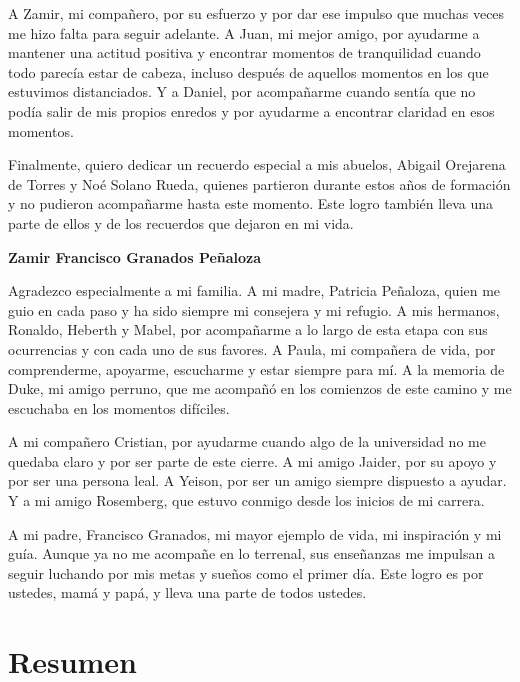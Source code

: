 \documentclass[12pt,oneside,spanish]{book}
\begin{document}
    A Zamir, mi compañero, por su esfuerzo y por dar ese impulso que muchas veces me hizo falta para seguir adelante. A Juan, mi mejor amigo, por ayudarme a mantener una actitud positiva y encontrar momentos de tranquilidad cuando todo parecía estar de cabeza, incluso después de aquellos momentos en los que estuvimos distanciados. Y a Daniel, por acompañarme cuando sentía que no podía salir de mis propios enredos y por ayudarme a encontrar claridad en esos momentos.
    
    Finalmente, quiero dedicar un recuerdo especial a mis abuelos, Abigail Orejarena de Torres y Noé Solano Rueda, quienes partieron durante estos años de formación y no pudieron acompañarme hasta este momento. Este logro también lleva una parte de ellos y de los recuerdos que dejaron en mi vida.
    
    \vspace{0.5cm}
    
    \noindent\textbf{Zamir Francisco Granados Peñaloza}
    
    Agradezco especialmente a mi familia. A mi madre, Patricia Peñaloza, quien me guio en cada paso y ha sido siempre mi consejera y mi refugio. A mis hermanos, Ronaldo, Heberth y Mabel, por acompañarme a lo largo de esta etapa con sus ocurrencias y con cada uno de sus favores. A Paula, mi compañera de vida, por comprenderme, apoyarme, escucharme y estar siempre para mí. A la memoria de Duke, mi amigo perruno, que me acompañó en los comienzos de este camino y me escuchaba en los momentos difíciles.
    
    A mi compañero Cristian, por ayudarme cuando algo de la universidad no me quedaba claro y por ser parte de este cierre. A mi amigo Jaider, por su apoyo y por ser una persona leal. A Yeison, por ser un amigo siempre dispuesto a ayudar. Y a mi amigo Rosemberg, que estuvo conmigo desde los inicios de mi carrera.
    
    A mi padre, Francisco Granados, mi mayor ejemplo de vida, mi inspiración y mi guía. Aunque ya no me acompañe en lo terrenal, sus enseñanzas me impulsan a seguir luchando por mis metas y sueños como el primer día. Este logro es por ustedes, mamá y papá, y lleva una parte de todos ustedes.
    
    
    
    \chapter*{Resumen}
    
\end{document}

